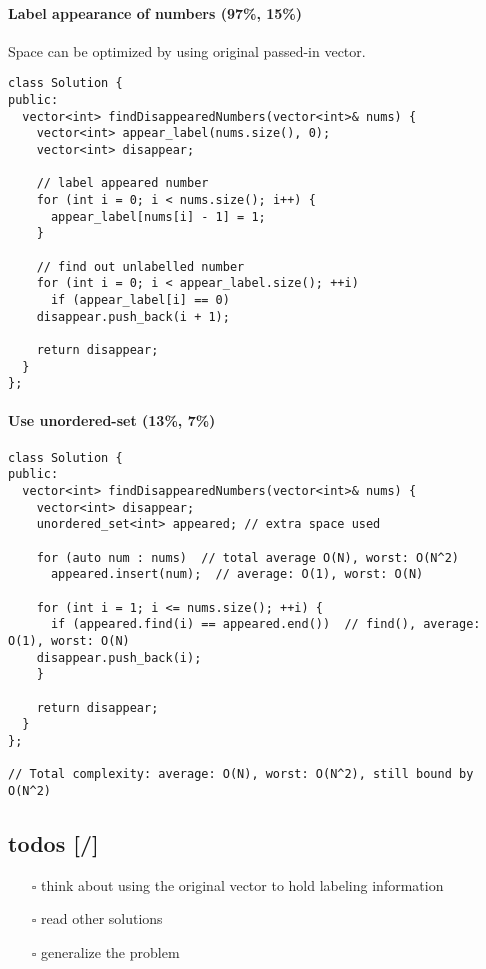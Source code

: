 \documentclass[12pt]{article}
\begin{document}
\paragraph{Label appearance of numbers (97\%, 15\%)}
\label{sec:org5fbd41e}
Space can be optimized by using original passed-in vector.
\begin{verbatim}
class Solution {
public:
  vector<int> findDisappearedNumbers(vector<int>& nums) {
    vector<int> appear_label(nums.size(), 0);
    vector<int> disappear;

    // label appeared number
    for (int i = 0; i < nums.size(); i++) {
      appear_label[nums[i] - 1] = 1;
    }

    // find out unlabelled number 
    for (int i = 0; i < appear_label.size(); ++i)
      if (appear_label[i] == 0)
	disappear.push_back(i + 1);

    return disappear;
  }
};
\end{verbatim}
\paragraph{Use unordered-set (13\%, 7\%)}
\label{sec:orgf18f73c}
\begin{verbatim}
class Solution {
public:
  vector<int> findDisappearedNumbers(vector<int>& nums) {
    vector<int> disappear;
    unordered_set<int> appeared; // extra space used

    for (auto num : nums)  // total average O(N), worst: O(N^2)
      appeared.insert(num);  // average: O(1), worst: O(N)

    for (int i = 1; i <= nums.size(); ++i) {
      if (appeared.find(i) == appeared.end())  // find(), average: O(1), worst: O(N)
	disappear.push_back(i);
    }

    return disappear;
  }
};

// Total complexity: average: O(N), worst: O(N^2), still bound by O(N^2)
\end{verbatim}
\subsection{todos [/]}
\label{sec:orga814c53}
\begin{itemize}
\item[{$\square$}] think about using the original vector to hold labeling information
\item[{$\square$}] read other solutions
\item[{$\square$}] generalize the problem
\end{itemize}
\end{document}
